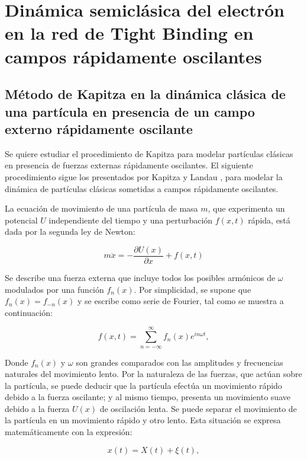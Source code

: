 \chapter{Dinámica semiclásica del electrón en la red de Tight Binding en campos rápidamente oscilantes}

\section{Método de Kapitza en la dinámica clásica de una partícula en presencia de un campo externo rápidamente oscilante}\label{cap:6}

Se quiere estudiar el procedimiento de Kapitza para modelar partículas clásicas en presencia de fuerzas externas rápidamente oscilantes. El siguiente procedimiento sigue los presentados por Kapitza \cite{kapitza} y Landau \cite{landau},  para modelar la dinámica de partículas clásicas sometidas a campos rápidamente oscilantes.

La ecuación de movimiento de una partícula de masa $m$, que experimenta un potencial $U$ independiente del tiempo y una perturbación $f(x,t)$ rápida, está dada por la segunda ley de Newton: 

\begin{equation}\label{eq:6.1}
    m\ddot{x}=-\frac{\partial U(x)}{\partial x}+f(x,t)
\end{equation}

Se describe una fuerza externa que incluye todos los posibles armónicos de $\omega$ modulados por una función $f_n(x)$. Por simplicidad, se supone que $f_n(x)=f_{-n}(x)$ y se escribe como serie de Fourier, tal como se muestra a continuación:

\begin{equation}\label{eq:6.2}
    f(x, t) = \sum^{\infty}_{n=-\infty} f_n(x)e^{in\omega t},
\end{equation}

Donde $f_n(x)$ y $\omega$ son grandes comparados con las amplitudes y frecuencias naturales del movimiento lento. Por la naturaleza de las fuerzas, que actúan sobre la partícula, se puede deducir que la partícula efectúa un movimiento rápido debido a la fuerza oscilante; y al mismo tiempo, presenta un movimiento suave debido a la fuerza $U(x)$ de oscilación lenta.
Se puede separar el movimiento de la partícula en un movimiento rápido y otro lento. Esta situación se expresa matemáticamente con la expresión:

\begin{equation}\label{eq:6.3}
    x(t) = X(t) + \xi(t),
\end{equation}

